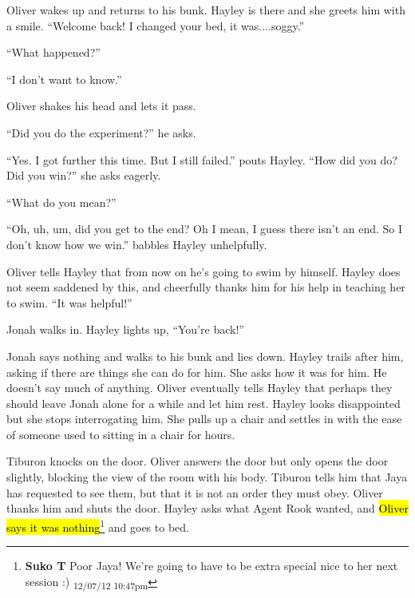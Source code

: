 Oliver wakes up and returns to his bunk.  Hayley is there and she greets him with a smile.  ``Welcome back!  I changed your bed, it was....soggy.''

``What happened?''

``I don't want to know.''

Oliver shakes his head and lets it pass.

``Did you do the experiment?'' he asks.

``Yes.  I got further this time.  But I still failed.'' pouts Hayley.  ``How did you do?  Did you win?'' she asks eagerly.

``What do you mean?''

``Oh, uh, um, did you get to the end?  Oh I mean, I guess there isn't an end.  So I don't know how we win.'' babbles Hayley unhelpfully.



Oliver tells Hayley that from now on he's going to swim by himself.  Hayley does not seem saddened by this, and cheerfully thanks him for his help in teaching her to swim. ``It was helpful!''



Jonah walks in.  Hayley lights up, ``You're back!''



Jonah says nothing and walks to his bunk and lies down.  Hayley trails after him, asking if there are things she can do for him.  She asks how it was for him.  He doesn't say much of anything.  Oliver eventually tells Hayley that perhaps they should leave Jonah alone for a while and let him rest.  Hayley looks disappointed but she stops interrogating him.  She pulls up a chair and settles in with the ease of someone used to sitting in a chair for hours.  



Tiburon knocks on the door. Oliver answers the door but only opens the door slightly, blocking the view of the room with his body.  Tiburon tells him that Jaya has requested to see them, but that it is not an order they must obey.  Oliver thanks him and shuts the door.  Hayley asks what Agent Rook wanted, and \hl{Oliver says it was nothing}\footnote{\textbf{Suko T }Poor Jaya!  We're going to have to be extra special nice to her next session :) \textsubscript{12/07/12 10:47pm}} and goes to bed.



